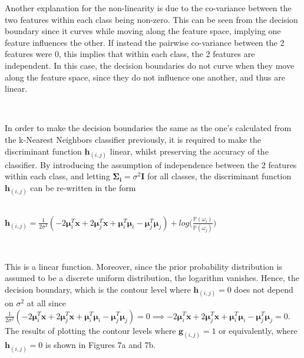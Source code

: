                                                                                         Another explanation for the non-linearity is due to the co-variance between the two features within each class being non-zero. This can be seen from the decision boundary since it curves while moving along the feature space, implying one feature influences the other. If instead the pairwise co-variance between the 2 features were 0, this implies that within each class, the 2 features are independent. In
                                                                                        this case, the decision boundaries do not curve when they move along the feature space, since they do not influence one another, and thus are linear.

                                                                                        \\ \vspace{5mm}

                                                                                        In order to make the decision boundaries the same as the one's calculated from the k-Nearest Neighbors classifier previously, it is required to make the discriminant function $\bm{h}_{(i,j)}$ linear, whilst preserving the accuracy of the classifier. By introducing the assumption of independence between the 2 features within each class, and letting $\bm{\Sigma_{i}} = \sigma^{2}
                                                                                        \bm{I}$\cite{bigformula} for all classes, the discriminant function $\bm{h}_{(i,j)}$ can be re-written in the form 

                                                                                        \\ \vspace{5mm}
                                                                                        $\bm{h}_{(i,j)} = \frac{1}{2 \sigma^{2}} (-2\bm{\mu}_{i}^{T} \bm{x} + 2\bm{\mu}_{j}^{T} \bm{x} + \bm{\mu}_{i}^{T}\bm{\mu}_{i} - \bm{\mu}_{j}^{T}\bm{\mu}_{j}) + log \Big( \frac{\mathbb{P}(\omega_{i})}{\mathbb{P}(\omega_{j})} \Big) $

                                                                                        \\ \vspace{5mm}

                                                                                        This is a linear function. Moreover, since the prior probability distribution is assumed to be a discrete uniform distribution, the logarithm vanishes. Hence, the decision boundary, which is the contour level where $\bm{h}_{(i,j)} = 0$ does not depend on $\sigma^2$ at all since $\frac{1}{2 \sigma^{2}} (-2\bm{\mu}_{i}^{T} \bm{x} + 2\bm{\mu}_{j}^{T} \bm{x} + \bm{\mu}_{i}^{T}\bm{\mu}_{i} -
                                                                                        \bm{\mu}_{j}^{T}\bm{\mu}_{j}) = 0 \implies  -2\bm{\mu}_{i}^{T} \bm{x} + 2\bm{\mu}_{j}^{T} \bm{x} + \bm{\mu}_{i}^{T}\bm{\mu}_{i} - \bm{\mu}_{j}^{T}\bm{\mu}_{j} = 0$. The results of plotting the contour levels where $\bm{g}_{(i,j)}= 1$ or equivalently, where $\bm{h}_{(i,j)} = 0$ is shown in Figures 7a and 7b.

